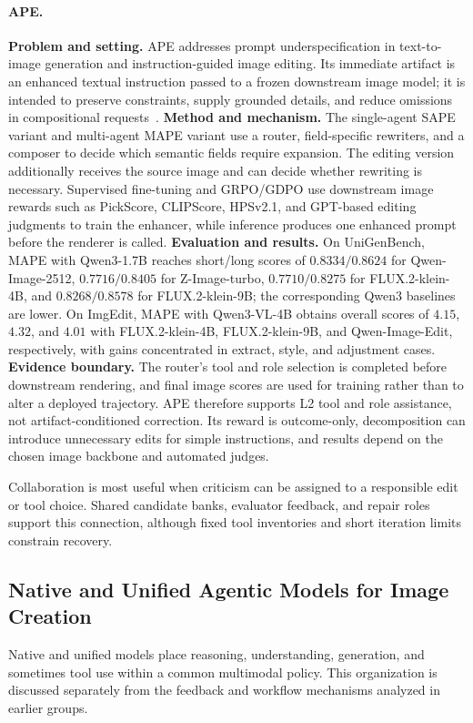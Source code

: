 \paragraph{APE.}
\textbf{Problem and setting.} APE addresses prompt underspecification in text-to-image generation and instruction-guided image editing. Its immediate artifact is an enhanced textual instruction passed to a frozen downstream image model; it is intended to preserve constraints, supply grounded details, and reduce omissions in compositional requests~\cite{avg260600204}. \textbf{Method and mechanism.} The single-agent SAPE variant and multi-agent MAPE variant use a router, field-specific rewriters, and a composer to decide which semantic fields require expansion. The editing version additionally receives the source image and can decide whether rewriting is necessary. Supervised fine-tuning and GRPO/GDPO use downstream image rewards such as PickScore, CLIPScore, HPSv2.1, and GPT-based editing judgments to train the enhancer, while inference produces one enhanced prompt before the renderer is called. \textbf{Evaluation and results.} On UniGenBench, MAPE with Qwen3-1.7B reaches short/long scores of $0.8334/0.8624$ for Qwen-Image-2512, $0.7716/0.8405$ for Z-Image-turbo, $0.7710/0.8275$ for FLUX.2-klein-4B, and $0.8268/0.8578$ for FLUX.2-klein-9B; the corresponding Qwen3 baselines are lower. On ImgEdit, MAPE with Qwen3-VL-4B obtains overall scores of $4.15$, $4.32$, and $4.01$ with FLUX.2-klein-4B, FLUX.2-klein-9B, and Qwen-Image-Edit, respectively, with gains concentrated in extract, style, and adjustment cases. \textbf{Evidence boundary.} The router's tool and role selection is completed before downstream rendering, and final image scores are used for training rather than to alter a deployed trajectory. APE therefore supports L2 tool and role assistance, not artifact-conditioned correction. Its reward is outcome-only, decomposition can introduce unnecessary edits for simple instructions, and results depend on the chosen image backbone and automated judges.

Collaboration is most useful when criticism can be assigned to a responsible edit or tool choice. Shared candidate banks, evaluator feedback, and repair roles support this connection, although fixed tool inventories and short iteration limits constrain recovery.

\subsection{Native and Unified Agentic Models for Image Creation}
Native and unified models place reasoning, understanding, generation, and sometimes tool use within a common multimodal policy. This organization is discussed separately from the feedback and workflow mechanisms analyzed in earlier groups.

